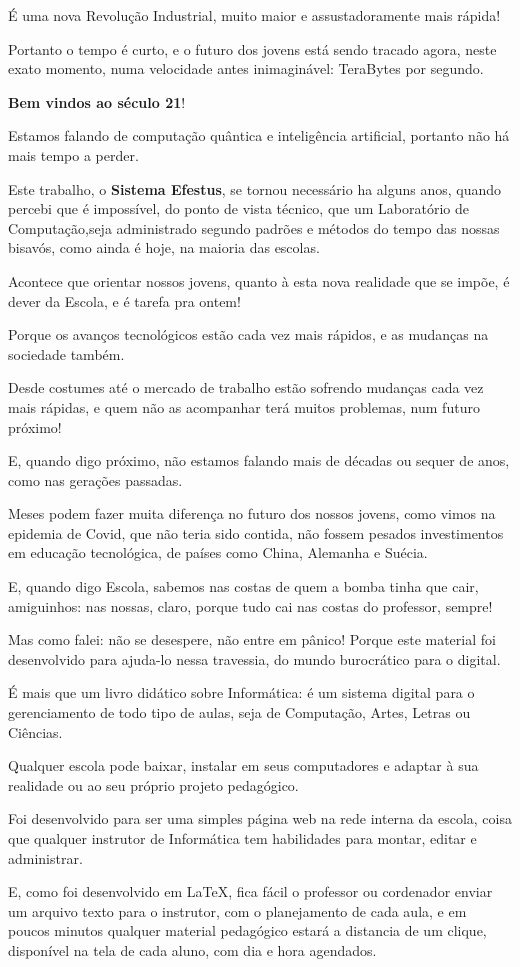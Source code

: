 \begin{multicols}{2}
É uma nova Revolução Industrial, muito maior e assustadoramente mais rápida!

Portanto o tempo é curto, e o futuro dos jovens está sendo tracado agora, neste exato momento, numa velocidade antes inimaginável: TeraBytes por segundo.

\textbf{Bem vindos ao século 21}!

Estamos falando de computação quântica e inteligência artificial, portanto não há mais tempo a perder.

Este trabalho, o \textbf{Sistema Efestus}, se tornou necessário ha alguns anos, quando percebi que é impossível, do ponto de vista técnico, que um Laboratório de Computação,seja administrado segundo padrões e métodos do tempo das nossas bisavós, como ainda é hoje, na maioria das escolas.

Acontece que orientar nossos jovens, quanto à esta nova realidade que se impõe, é dever da Escola, e é tarefa pra ontem!

Porque os avanços tecnológicos estão cada vez mais rápidos, e as mudanças na sociedade também.

Desde costumes até o mercado de trabalho estão sofrendo mudanças cada vez mais rápidas, e quem não as acompanhar terá muitos problemas, num futuro próximo!

E, quando digo próximo, não estamos falando mais de décadas ou sequer de anos, como nas gerações passadas.

Meses podem fazer muita diferença no futuro dos nossos jovens, como vimos na epidemia de Covid, que não teria sido contida, não fossem pesados investimentos em educação tecnológica, de países como China, Alemanha e Suécia.

E, quando digo Escola, sabemos nas costas de quem a bomba tinha que cair, amiguinhos: nas nossas, claro, porque tudo cai nas costas do professor, sempre!

Mas como falei: não se desespere, não entre em pânico! Porque este material foi desenvolvido para ajuda-lo nessa travessia, do mundo burocrático para o digital.

É mais que um livro didático sobre Informática: é um sistema digital para o gerenciamento de todo tipo de aulas, seja de Computação, Artes, Letras ou Ciências.

Qualquer escola pode baixar, instalar em seus computadores e adaptar à sua realidade ou ao seu próprio projeto pedagógico.

Foi desenvolvido para ser uma simples página web na rede interna da escola, coisa que qualquer instrutor de Informática tem habilidades para montar, editar e administrar.

E, como foi desenvolvido em \LaTeX, fica fácil o professor ou cordenador enviar um arquivo texto para o instrutor, com o planejamento de cada aula, e em poucos minutos qualquer material pedagógico estará a distancia de um clique, disponível na tela de cada aluno, com dia e hora agendados.

\vfill

\pagebreak

\end{multicols}
